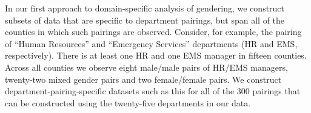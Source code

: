 \documentclass{pnastwo}
\begin{document}
\begin{article}

In our first approach to domain-specific analysis of gendering, we construct subsets of data that are specific to department pairings, but span all of the counties in which such pairings are observed. Consider, for example, the pairing of ``Human Resources'' and ``Emergency Services'' departments (HR and EMS, respectively). There is at least one HR and one EMS manager in fifteen counties. Across all counties we observe eight male/male pairs of HR/EMS managers, twenty-two mixed gender pairs and two female/female pairs. We construct department-pairing-specific datasets such as this for all of the 300 pairings that can be constructed using the twenty-five departments in our data. 
 

\end{article}
\end{document}
